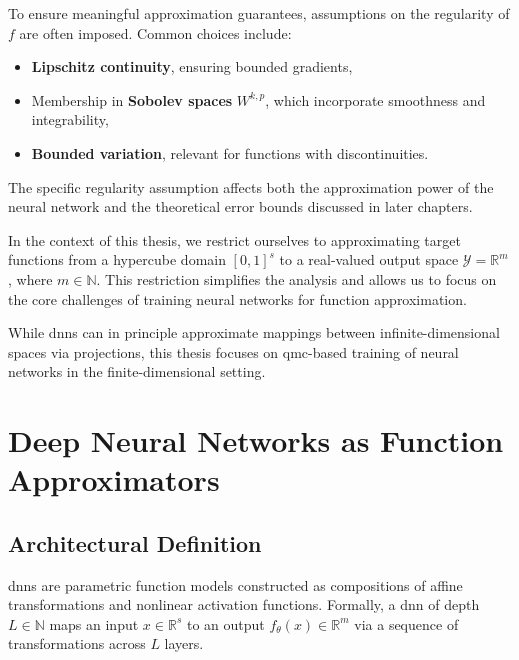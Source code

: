 To ensure meaningful approximation guarantees, assumptions on the regularity of
$ f $ are often imposed. Common choices include:
\begin{itemize}
  \item \textbf{Lipschitz continuity}, ensuring bounded gradients,
  \item Membership in \textbf{Sobolev spaces} $ W^{k,p} $, which incorporate
  smoothness and integrability,
  \item \textbf{Bounded variation}, relevant for functions with discontinuities.
\end{itemize}

The specific regularity assumption affects both the approximation power of the
neural network and the theoretical error bounds discussed in later chapters.

\begin{remark}
  In the context of this thesis, we restrict ourselves to approximating target functions from a hypercube domain $ [0,1]^s $ to a real-valued output space $ \mathcal{Y} = \mathbb{R}^m $, where $ m \in \mathbb{N} $. This restriction simplifies the analysis and allows us to focus on the core challenges of training neural networks for function approximation.

  While \acp{dnn} can in principle approximate mappings between infinite-dimensional
  spaces via projections, this thesis focuses on \acs{qmc}-based training of neural
  networks in the finite-dimensional setting\cite{kovachki2023neural}.
\end{remark}


\section{Deep Neural Networks as Function Approximators}
\label{sec:dnn-definition}

\subsection{Architectural Definition}
\label{subsec:dnn-architecture}

\acfp{dnn} are parametric function models constructed as compositions of affine transformations and nonlinear activation functions. Formally, a \ac{dnn} of depth $L \in \mathbb{N}$ maps an input $x \in \mathbb{R}^s$ to an output $f_\theta(x) \in \mathbb{R}^m$ via a sequence of transformations across $L$ layers.

